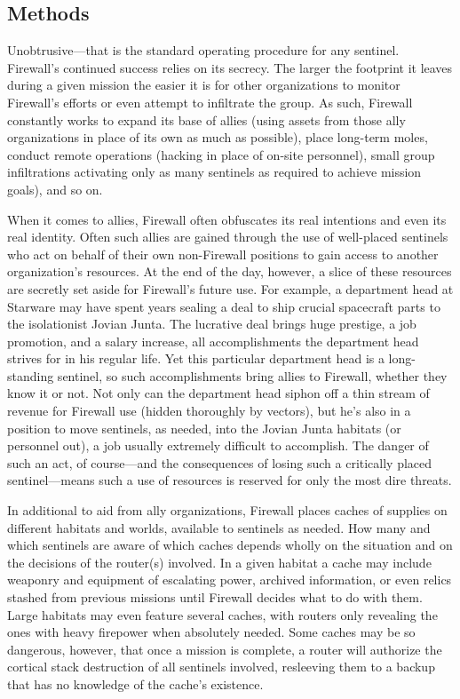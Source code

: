 
\subsection{Methods }

Unobtrusive—that is the standard operating procedure
for any sentinel. Firewall's continued success
relies on its secrecy. The larger the footprint
it leaves during a given mission the easier it is for 
other organizations to monitor Firewall's efforts or 
even attempt to infiltrate the group. As such, Firewall
constantly works to expand its base of allies
(using assets from those ally organizations in place 
of its own as much as possible), place long-term 
moles, conduct remote operations (hacking in place 
of on-site personnel), small group infiltrations activating
only as many sentinels as required to achieve
mission goals), and so on. 

When it comes to allies, Firewall often obfuscates 
its real intentions and even its real identity. Often 
such allies are gained through the use of well-placed 
sentinels who act on behalf of their own non-Firewall
positions to gain access to another organization's
resources. At the end of the day, however,
a slice of these resources are secretly set aside for 
Firewall's future use. For example, a department 
head at Starware may have spent years sealing a 
deal to ship crucial spacecraft parts to the isolationist
Jovian Junta. The lucrative deal brings huge
prestige, a job promotion, and a salary increase, all 
accomplishments the department head strives for in 
his regular life. Yet this particular department head 
is a long-standing sentinel, so such accomplishments
bring allies to Firewall, whether they know
it or not. Not only can the department head siphon 
off a thin stream of revenue for Firewall use (hidden 
thoroughly by vectors), but he's also in a position 
to move sentinels, as needed, into the Jovian Junta 
habitats (or personnel out), a job usually extremely 
difficult to accomplish. The danger of such an act, 
of course—and the consequences of losing such a 
critically placed sentinel—means such a use of resources
is reserved for only the most dire threats.

In additional to aid from ally organizations, Firewall
places caches of supplies on different habitats
and worlds, available to sentinels as needed. How 
many and which sentinels are aware of which 
caches depends wholly on the situation and on the 
decisions of the router(s) involved. In a given habitat
a cache may include weaponry and equipment
of escalating power, archived information, or even 
relics stashed from previous missions until Firewall 
decides what to do with them. Large habitats may 
even feature several caches, with routers only revealing
the ones with heavy firepower when absolutely
needed. Some caches may be so dangerous,
however, that once a mission is complete, a router 
will authorize the cortical stack destruction of all 
sentinels involved, resleeving them to a backup that 
has no knowledge of the cache's existence.

